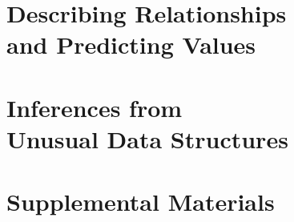 \documentclass{bookTemplate}
\begin{document}
\part{Describing Relationships\\ and Predicting Values}






\part{Inferences from\\ Unusual Data Structures}





\part{Supplemental Materials}








\end{document}
